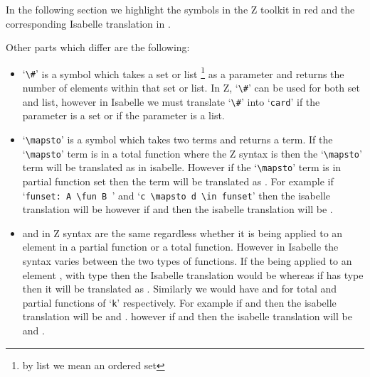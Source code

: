 In the following section we highlight the symbols in the Z toolkit in {\color{set}red}
and the corresponding Isabelle translation in {\color{blue}{blue}}.

Other parts which differ are the following:

\begin{itemize}
\item {\color{red}`\verb|\#|'} is a symbol which takes a set or list \footnote{by list we
mean an ordered set} as a parameter and returns the number of elements within
that set or list. In Z, {\color{red}`\verb|\#|'} can be used for both set and list, however
in Isabelle we must translate {\color{red}`\verb|\#|'} into {\color{blue}`\verb|card|'} if the parameter is
a set or {\color{blue}{`\verb|length|'}} if the parameter is a list.

\item {\color{red}`\verb|\mapsto|'} is a symbol which takes two terms and returns a term. If
the {\color{red}`\verb|\mapsto|'} term is in a total function where the Z syntax is {\color{red}{`\verb|A \fun B|'}} then the 
{\color{red}`\verb|\mapsto|'} term will be translated as {\color{blue}{`\verb|(f,s)|'}} in isabelle. However if the
{\color{red}`\verb|\mapsto|'} term is in partial function set then the {\color{red}{`\verb|\mapsto|'}} term will be
translated as {\color{blue}{`\verb|f s|'}}.
For example
if {\color{red}`\verb|funset: A \fun B |'} and {\color{red}`\verb|c \mapsto d \in funset|'}
then the isabelle translation will be {\color{blue}{$(c,d) \in funset$}}
however if {\color{red}{`\verb|pfunset: A \pfun B |'}} and {\color{red}{`\verb|c \mapsto d \in pfunset|'}}
then the isabelle translation will be {\color{blue}{$c\ d \in pfunset$}}.

\item {\color{red}{`\verb|\dom|'}} and {\color{red}{`\verb|\ran|'}} in Z syntax are the same regardless whether it is
being applied to an element in a partial function or a total function. However
in Isabelle the syntax varies between the two types of functions. If the
{\color{red}{`\verb|\dom|'}} being applied to an element {\color{red}{`\verb|k|'}}, with type
{\color{red}{`\verb|A \fun B|'}} then the Isabelle translation would be {\color{blue}{`\verb|Domain k|'}} whereas if
{\color{red}{`\verb|k|'}} has type {\color{red}{`\verb|A \pfun B|'}} then it will be
translated as {\color{blue}{`\verb|dom k|'}}. Similarly we would
have {\color{blue}{`\verb|Range k|'}} and {\color{blue}{`\verb|ran k|'}} for total and partial functions of
`\verb|k|' respectively.
For example
if {\color{red}{`\verb|funset: A \fun B |'}} and {\color{red}{`\verb|\dom k \in funset|'}}
then the isabelle translation will be {\color{blue}{$(A*B) set$}} and {\color{blue}{$Domain\ k \in funset$}}.
however if {\color{red}{`\verb|pfunset: A \pfun B |'}} and {\color{red}{`\verb|\dom k \in pfunset|'}}
then the isabelle translation will be {\color{blue}{$A \rightharpoonup B$}} and {\color{blue}{$dom\ k$}}.

\end{itemize}


